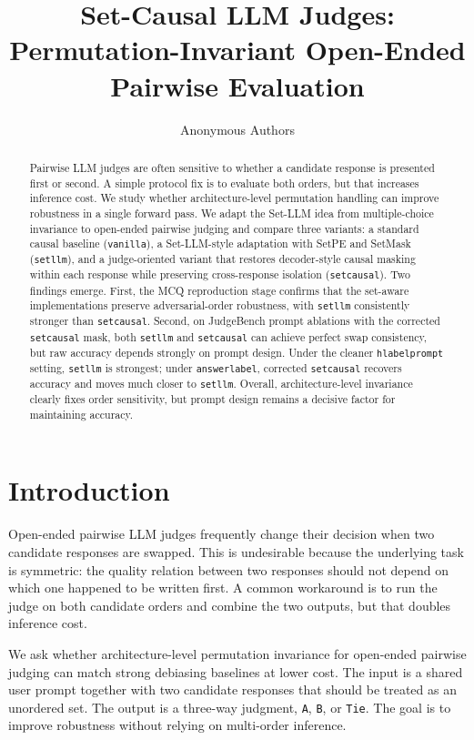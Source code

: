 \documentclass{article}
\title{Set-Causal LLM Judges:\\Permutation-Invariant Open-Ended Pairwise Evaluation}
\author{Anonymous Authors}
\begin{document}
\maketitle

\begin{abstract}
Pairwise LLM judges are often sensitive to whether a candidate response is presented first or second. A simple protocol fix is to evaluate both orders, but that increases inference cost. We study whether architecture-level permutation handling can improve robustness in a single forward pass. We adapt the Set-LLM idea from multiple-choice invariance to open-ended pairwise judging and compare three variants: a standard causal baseline (\texttt{vanilla}), a Set-LLM-style adaptation with SetPE and SetMask (\texttt{setllm}), and a judge-oriented variant that restores decoder-style causal masking within each response while preserving cross-response isolation (\texttt{setcausal}). Two findings emerge. First, the MCQ reproduction stage confirms that the set-aware implementations preserve adversarial-order robustness, with \texttt{setllm} consistently stronger than \texttt{setcausal}. Second, on JudgeBench prompt ablations with the corrected \texttt{setcausal} mask, both \texttt{setllm} and \texttt{setcausal} can achieve perfect swap consistency, but raw accuracy depends strongly on prompt design. Under the cleaner \texttt{hlabelprompt} setting, \texttt{setllm} is strongest; under \texttt{answerlabel}, corrected \texttt{setcausal} recovers accuracy and moves much closer to \texttt{setllm}. Overall, architecture-level invariance clearly fixes order sensitivity, but prompt design remains a decisive factor for maintaining accuracy.
\end{abstract}

\section{Introduction}

Open-ended pairwise LLM judges frequently change their decision when two candidate responses are swapped. This is undesirable because the underlying task is symmetric: the quality relation between two responses should not depend on which one happened to be written first. A common workaround is to run the judge on both candidate orders and combine the two outputs, but that doubles inference cost.

We ask whether architecture-level permutation invariance for open-ended pairwise judging can match strong debiasing baselines at lower cost. The input is a shared user prompt together with two candidate responses that should be treated as an unordered set. The output is a three-way judgment, \texttt{A}, \texttt{B}, or \texttt{Tie}. The goal is to improve robustness without relying on multi-order inference.
\end{document}
